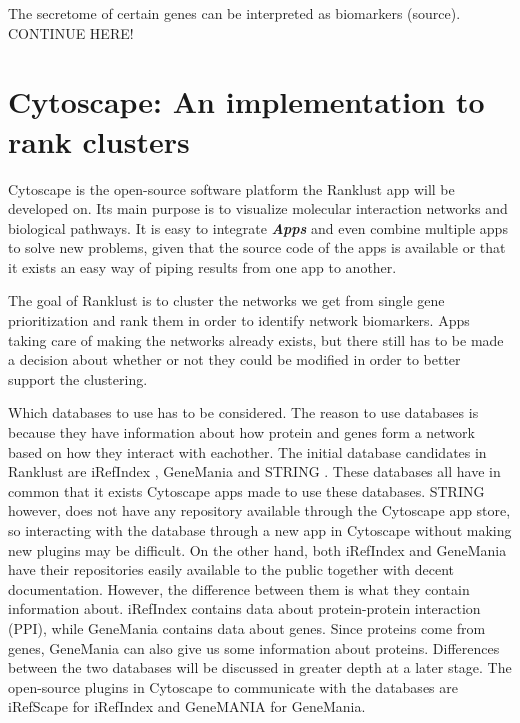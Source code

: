 \documentclass[UKenglish,11pt,a4paper]{article}
\begin{document}

The secretome of certain genes can be interpreted as biomarkers (source). CONTINUE HERE!

\chapter{Cytoscape: An implementation to rank clusters}
Cytoscape is the open-source software platform the Ranklust app will be developed on. Its main purpose is to visualize
molecular interaction networks and biological pathways.  It is easy to integrate \textbf{\textit{Apps}} and even combine 
multiple apps to solve new problems, given that the source code of the apps is available or that it exists an easy way of 
piping results from one app to another. 

The goal of Ranklust is to cluster the networks we get from single gene prioritization and rank them in order to 
identify network biomarkers. Apps taking care of making the networks already exists, but there still has to be made a 
decision about whether or not they could be modified in order to better support the clustering.

Which databases to use has to be considered. The reason to use databases is because they have information about how 
protein and genes form a network based on how they interact with eachother. The initial database candidates in Ranklust 
are iRefIndex \cite{iri}, GeneMania \cite{gm} and STRING \cite{str}. These databases all have in common that it exists
Cytoscape apps made to use these databases. STRING however, does not have any repository available through the Cytoscape
app store, so interacting with the database through a new app in Cytoscape without making new plugins may be difficult.
On the other hand, both iRefIndex and GeneMania have their repositories easily available to the public together with
decent documentation. However, the difference between them is what they contain information about. iRefIndex contains
data about protein-protein interaction (PPI), while GeneMania contains data about genes.
Since proteins come from genes, GeneMania can also give us some information about proteins. Differences between the
two databases will be discussed in greater depth at a later stage.
The open-source plugins in Cytoscape to communicate with the databases are iRefScape \cite{iridb} for iRefIndex and 
GeneMANIA \cite{gmdb} for GeneMania.
\end{document}
